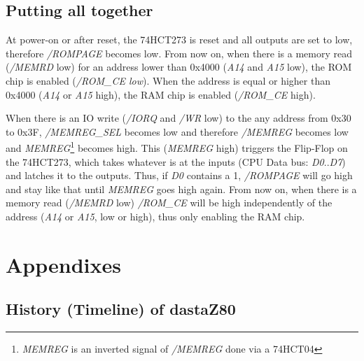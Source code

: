 \documentclass[a4paper,11pt]{article}
\begin{document}
    \subsection{Putting all together}
    
    At power-on or after reset, the 74HCT273 is reset and all outputs are set to
    low, therefore \textit{/ROMPAGE} becomes low. From now on, when there is a
    memory read (\textit{/MEMRD} low) for an address lower than 0x4000
    (\textit{A14} and \textit{A15} low), the ROM chip is enabled
    (\textit{/ROM\_CE low}). When the address is equal or higher than 0x4000
    (\textit{A14} or \textit{A15} high), the RAM chip is enabled
    (\textit{/ROM\_CE} high).

    When there is an IO write (\textit{/IORQ} and \textit{/WR} low) to the any
    address from 0x30 to 0x3F, \textit{/MEMREG\_SEL} becomes low and therefore 
    \textit{/MEMREG} becomes low and \textit{MEMREG}\footnote{\textit{MEMREG} is
    an inverted signal of \textit{/MEMREG} done via a 74HCT04} becomes high. This
    (\textit{MEMREG} high) triggers the Flip-Flop on the 74HCT273, which takes
    whatever is at the inputs (CPU Data bus: \textit{D0}..\textit{D7}) and
    latches it to the outputs. Thus, if \textit{D0} contains a 1,
    \textit{/ROMPAGE} will go high and stay like that until \textit{MEMREG} goes
    high again. From now on, when there is a memory read (\textit{/MEMRD} low)
    \textit{/ROM\_CE} will be high independently of the address (\textit{A14}
    or \textit{A15}, low or high), thus only enabling the RAM chip.

    \pagebreak
    \section{Appendixes}
    \label{sec:appendixes}

    \subsection{History (Timeline) of dastaZ80}
\end{document}
